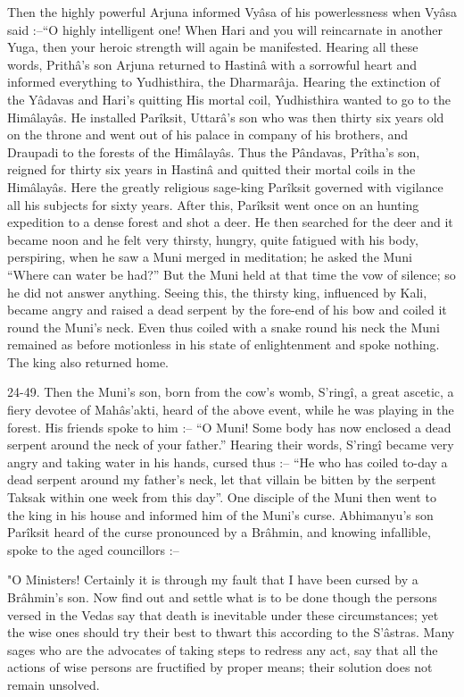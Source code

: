 Then the highly powerful Arjuna informed Vyâsa of his powerlessness when Vyâsa said :--“O highly intelligent one! When Hari and you will reincarnate in another Yuga, then your heroic strength will again be manifested. Hearing all these words, Prithâ's son Arjuna returned to Hastinâ with a sorrowful heart and informed everything to Yudhisthira, the Dharmarâja. Hearing the extinction of the Yâdavas and Hari's quitting His mortal coil, Yudhisthira wanted to go to the Himâlayâs. He installed Parîksit, Uttarâ's son who was then thirty six years old on the throne and went out of his palace in company of his brothers, and Draupadi to the forests of the Himâlayâs. Thus the Pândavas, Prîtha's son, reigned for thirty six years in Hastinâ and quitted their mortal coils in the Himâlayâs. Here the greatly religious sage-king Parîksit governed with vigilance all his subjects for sixty years. After this, Parîksit went once on an hunting expedition to a dense forest and shot a deer. He then searched for the deer and it became noon and he felt very thirsty, hungry, quite fatigued with his body, perspiring, when he saw a Muni merged in meditation; he asked the Muni “Where can water be had?” But the Muni held at that time the vow of silence; so he did not answer anything. Seeing this, the thirsty king, influenced by Kali, became angry and raised a dead serpent by the fore-end of his bow and coiled it round the Muni's neck. Even thus coiled with a snake round his neck the Muni remained as before motionless in his state of enlightenment and spoke nothing. The king also returned home.

 

24-49. Then the Muni's son, born from the cow's womb, S’ringî, a great ascetic, a fiery devotee of Mahâs'akti, heard of the above event, while he was playing in the forest. His friends spoke to him :-- “O Muni! Some body has now enclosed a dead serpent around the neck of your father.” Hearing their words, S’ringî became very angry and taking water in his hands, cursed thus :-- “He who has coiled to-day a dead serpent around my father's neck, let that villain be bitten by the serpent Taksak within one week from this day”. One disciple of the Muni then went to the king in his house and informed him of the Muni's curse. Abhimanyu's son Parîksit heard of the curse pronounced by a Brâhmin, and knowing infallible, spoke to the aged councillors :--

 

"O Ministers! Certainly it is through my fault that I have been cursed by a Brâhmin's son. Now find out and settle what is to be done though the persons versed in the Vedas say that death is inevitable under these circumstances; yet the wise ones should try their best to thwart this according to the S’âstras. Many sages who are the advocates of taking steps to redress any act, say that all the actions of wise persons are fructified by proper means; their solution does not remain unsolved.

